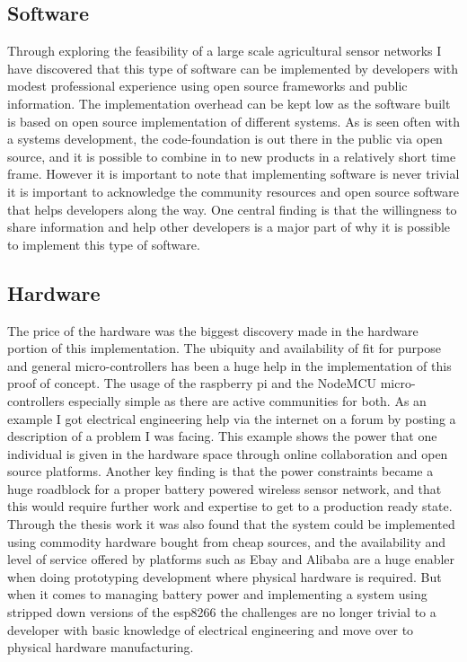 \documentclass[]{uiophd}
\begin{document}
\subsection{Software}
Through exploring the feasibility of a large scale agricultural sensor networks I have discovered that this type of software can be implemented by developers with modest professional experience using open source frameworks and public information. The implementation overhead can be kept low as the software built is based on open source implementation of different systems. As is seen often with a systems development, the code-foundation is out there in the public via open source, and it is possible to combine in to new products in a relatively short time frame. However it is important to note that implementing software is never trivial it is important to acknowledge the community resources and open source software that helps developers along the way. One central finding is that the willingness to share information and help other developers is a major part of why it is possible to implement this type of software.

\subsection{Hardware}
The price of the hardware was the biggest discovery made in the hardware portion of this implementation. The ubiquity and availability of fit for purpose and general micro-controllers has been a huge help in the implementation of this proof of concept. The usage of the raspberry pi and the NodeMCU micro-controllers especially simple as there are active communities for both. As an example I got electrical engineering help via the internet on a forum by posting a description of a problem I was facing. This example shows the power that one individual is given in the hardware space through online collaboration and open source platforms.  Another key finding is that the power constraints became a huge roadblock for a proper battery powered wireless sensor network, and that this would require further work and expertise to get to a production ready state. Through the thesis work it was also found that the system could be implemented using commodity hardware bought from cheap sources, and the availability and level of service offered by platforms such as Ebay and Alibaba are a huge enabler when doing prototyping development where physical hardware is required. But when it comes to managing battery power and implementing a system using stripped down versions of the esp8266\cite{espressif} the challenges are no longer trivial to a developer with basic knowledge of electrical engineering and move over to physical hardware manufacturing.
\end{document}
